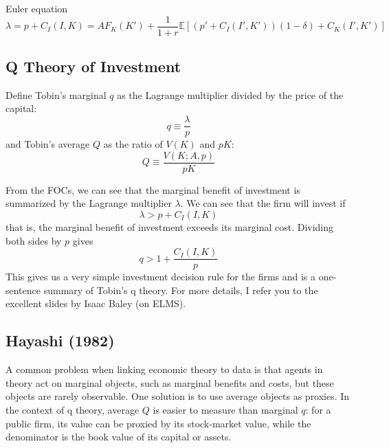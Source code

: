 \documentclass[12pt]{article}
\begin{document}
Euler equation
\begin{equation}
	\lambda = p + C_I(I,K) = A F_K(K') + \frac{1}{1+r} \mathbb{E}\left[\left(p' + C_I(I', K')\right) (1-\delta) + C_K(I', K')\right]
\end{equation}

\subsection{Q Theory of Investment}

Define Tobin's marginal $q$ as the Lagrange multiplier divided by the price of the capital:
\begin{equation}
	q \equiv \frac{\lambda}{p}
\end{equation}
and Tobin's average $Q$ as the ratio of $V(K)$ and $p K$:
\begin{equation}
	Q \equiv \frac{V(K; A, p)}{p K}
\end{equation}

From the FOCs, we can see that the marginal benefit of investment is summarized by the Lagrange multiplier $\lambda$. We can see that the firm will invest if 
\begin{equation}
	\lambda > p + C_I(I,K)
\end{equation}
that is, the marginal benefit of investment exceeds its marginal cost. Dividing both sides by $p$ gives
\begin{equation}
	q > 1 + \frac{C_I(I, K)}{p}
\end{equation}
This gives us a very simple investment decision rule for the firms and is a one-sentence summary of Tobin's q theory. For more details, I refer you to the excellent slides by Isaac Baley (on ELMS).

\subsection{Hayashi (1982)}

A common problem when linking economic theory to data is that agents in theory act on marginal objects, such as marginal benefits and costs, but these objects are rarely observable. One solution is to use average objects as proxies. In the context of q theory, average $Q$ is easier to measure than marginal $q$: for a public firm, its value can be proxied by its stock-market value, while the denominator is the book value of its capital or assets. 
\end{document}
